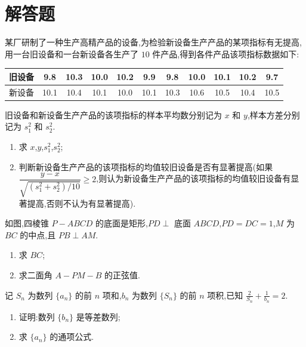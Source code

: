 \section{解答题}

\begin{problem}
某厂研制了一种生产高精产品的设备,为检验新设备生产产品的某项指标有无提高,用一台旧设备和一台新设备各生产了 \(10\) 件产品,得到各件产品该项指标数据如下:

\begin{center}
\begin{tabular}{|c|*{10}{c|}}
\hline
旧设备 & 9.8 & 10.3 & 10.0 & 10.2 & 9.9 & 9.8 & 10.0 & 10.1 & 10.2 & 9.7 \\
\hline
新设备 & 10.1 & 10.4 & 10.1 & 10.0 & 10.1 & 10.3 & 10.6 & 10.5 & 10.4 & 10.5 \\
\hline
\end{tabular}
\end{center}

旧设备和新设备生产产品的该项指标的样本平均数分别记为 \(x\) 和 \(y\),样本方差分别记为 \(s_1^2\) 和 \(s_2^2\).

\begin{enumerate}
\item 求 \(x\),\(y\),\(s_1^2\),\(s_2^2\);

\item 判断新设备生产产品的该项指标的均值较旧设备是否有显著提高(如果 \(\dfrac{y-x}{\sqrt{\left( s_1^2+s_2^2 \right)/10}}\ge 2\),则认为新设备生产产品的该项指标的均值较旧设备有显著提高,否则不认为有显著提高).
\end{enumerate}
\end{problem}

\begin{problem}
如图,四棱锥 \(P-ABCD\) 的底面是矩形,\(PD\perp\) 底面 \(ABCD\),\(PD=DC=1\),\(M\) 为 \(BC\) 的中点,且 \(PB\perp AM\).

\begin{enumerate}
\item 求 \(BC\);

\item 求二面角 \(A-PM-B\) 的正弦值.
\end{enumerate}

\end{problem}

\begin{problem}
记 \(S_n\) 为数列 \(\{a_n\}\) 的前 \(n\) 项和,\(b_n\) 为数列 \(\{S_n\}\) 的前 \(n\) 项积,已知 \(\frac{2}{S_n}+\frac{1}{b_n}=2\).

\begin{enumerate}
\item 证明:数列 \(\{b_n\}\) 是等差数列;

\item 求 \(\{a_n\}\) 的通项公式.
\end{enumerate}
\end{problem}


